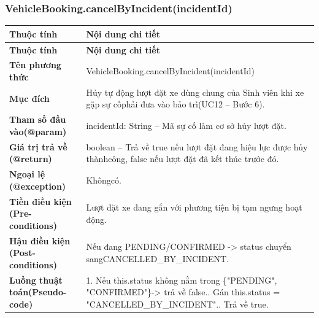 \subsubsection{VehicleBooking.cancelByIncident(incidentId)}
\begin{longtable}{|L{0.24\textwidth}|L{0.70\textwidth}|}
\hline
\textbf{Thuộc tính} & \textbf{Nội dung chi tiết} \\
\hline
\endfirsthead
\hline
\textbf{Thuộc tính} & \textbf{Nội dung chi tiết} \\
\hline
\endhead
\textbf{Tên phương thức} & VehicleBooking.cancelByIncident(incidentId) \\
\hline
\textbf{Mục đích} & Hủy tự động lượt đặt xe dùng chung của Sinh viên khi xe gặp sự cố\newline phải đưa vào bảo trì(UC12 – Bước 6). \\
\hline
\textbf{Tham số đầu vào}\newline \textbf{(@param)} & incidentId: String – Mã sự cố làm cơ sở hủy lượt đặt. \\
\hline
\textbf{Giá trị trả về (@return)} & boolean – Trả về true nếu lượt đặt đang hiệu lực được hủy thành\newline công, false nếu lượt đặt đã kết thúc trước đó. \\
\hline
\textbf{Ngoại lệ (@exception)} & Khôngcó. \\
\hline
\textbf{Tiền điều kiện (Pre-}\newline \textbf{conditions)} & Lượt đặt xe đang gắn với phương tiện bị tạm ngưng hoạt động. \\
\hline
\textbf{Hậu điều kiện (Post-}\newline \textbf{conditions)} & Nếu đang PENDING/CONFIRMED -> status chuyển sang\newline CANCELLED\_BY\_INCIDENT. \\
\hline
\textbf{Luồng thuật toán}\newline \textbf{(Pseudo-code)} & 1. Nếu this.status không nằm trong \{"PENDING", "CONFIRMED"\}\newline -> trả về false.. Gán this.status = "CANCELLED\_BY\_INCIDENT".. Trả về true. \\
\hline
\end{longtable}
\vspace{-0.5\baselineskip}

